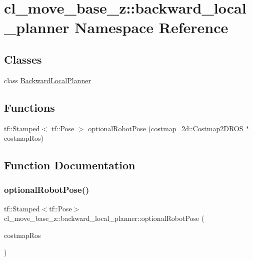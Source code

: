 \hypertarget{namespacecl__move__base__z_1_1backward__local__planner}{}\section{cl\+\_\+move\+\_\+base\+\_\+z\+:\+:backward\+\_\+local\+\_\+planner Namespace Reference}
\label{namespacecl__move__base__z_1_1backward__local__planner}
\subsection*{Classes}
\begin{DoxyCompactItemize}
\item 
class \hyperlink{classcl__move__base__z_1_1backward__local__planner_1_1BackwardLocalPlanner}{Backward\+Local\+Planner}
\end{DoxyCompactItemize}
\subsection*{Functions}
\begin{DoxyCompactItemize}
\item 
tf\+::\+Stamped$<$ tf\+::\+Pose $>$ \hyperlink{namespacecl__move__base__z_1_1backward__local__planner_afd5bb2a0d144f7b89f4215fbcb1fbe69}{optional\+Robot\+Pose} (costmap\+\_\+2d\+::\+Costmap2\+D\+R\+OS $\ast$costmap\+Ros)
\end{DoxyCompactItemize}


\subsection{Function Documentation}
\mbox{\label{namespacecl__move__base__z_1_1backward__local__planner_afd5bb2a0d144f7b89f4215fbcb1fbe69}} 
\subsubsection{\texorpdfstring{optional\+Robot\+Pose()}{optionalRobotPose()}}
{\footnotesize\ttfamily tf\+::\+Stamped$<$tf\+::\+Pose$>$ cl\+\_\+move\+\_\+base\+\_\+z\+::backward\+\_\+local\+\_\+planner\+::optional\+Robot\+Pose (\begin{DoxyParamCaption}\item[{costmap\+\_\+2d\+::\+Costmap2\+D\+R\+OS $\ast$}]{costmap\+Ros }\end{DoxyParamCaption})}




